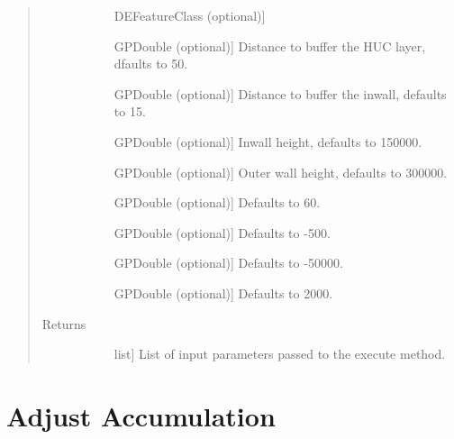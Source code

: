 \documentclass[letterpaper,10pt,english]{sphinxmanual}
\begin{document}
\begin{fulllineitems}
\begin{fulllineitems}
\begin{quote}
\begin{description}
\begin{description}
\item[{}] \leavevmode{[}DEFeatureClass (optional){]}
\item[{}] \leavevmode{[}GPDouble (optional){]}
Distance to buffer the HUC layer, dfaults to 50.

\item[{}] \leavevmode{[}GPDouble (optional){]}
Distance to buffer the inwall, defaults to 15.

\item[{}] \leavevmode{[}GPDouble (optional){]}
Inwall height, defaults to 150000.

\item[{}] \leavevmode{[}GPDouble (optional){]}
Outer wall height, defaults to 300000.

\item[{}] \leavevmode{[}GPDouble (optional){]}
Defaults to 60.

\item[{}] \leavevmode{[}GPDouble (optional){]}
Defaults to -500.

\item[{}] \leavevmode{[}GPDouble (optional){]}
Defaults to -50000.

\item[{}] \leavevmode{[}GPDouble (optional){]}
Defaults to 2000.

\end{description}

\item[{Returns}] \leavevmode\begin{description}
\item[{}] \leavevmode{[}list{]}
List of input parameters passed to the execute method.

\end{description}

\end{description}\end{quote}

\end{fulllineitems}


\end{fulllineitems}



\section{Adjust Accumulation}
\label{\detokenize{StreamStats_DataPrep:adjust-accumulation}}
\end{document}
